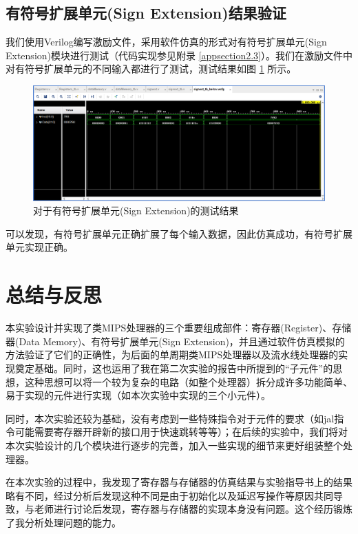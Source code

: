 \documentclass{cumcm}
\numberwithin{equation}{section}
\numberwithin{equation}{subsection}
\begin{document}
\subsection{有符号扩展单元(Sign Extension)结果验证}\label{section4.3}

我们使用Verilog编写激励文件，采用软件仿真的形式对有符号扩展单元(Sign Extension)模块进行测试（代码实现参见附录 \ref{appsection2.3}）。我们在激励文件中对有符号扩展单元的不同输入都进行了测试，测试结果如图 \ref{fig5} 所示。

\begin{figure}[htbp]
    \centering
    \includegraphics[width=6.3in]{3.png}
    \caption{对于有符号扩展单元(Sign Extension)的测试结果}
    \label{fig5}
\end{figure}

可以发现，有符号扩展单元正确扩展了每个输入数据，因此仿真成功，有符号扩展单元实现正确。

\section{总结与反思}\label{section5}
本实验设计并实现了类MIPS处理器的三个重要组成部件：寄存器(Register)、存储器(Data Memory)、有符号扩展单元(Sign Extension)，并且通过软件仿真模拟的方法验证了它们的正确性，为后面的单周期类MIPS处理器以及流水线处理器的实现奠定基础。同时，这也运用了我在第二次实验的报告中所提到的“子元件”的思想，这种思想可以将一个较为复杂的电路（如整个处理器）拆分成许多功能简单、易于实现的元件进行实现（如本次实验中实现的三个小元件）。

同时，本次实验还较为基础，没有考虑到一些特殊指令对于元件的要求（如jal指令可能需要寄存器开辟新的接口用于快速跳转等等）；在后续的实验中，我们将对本次实验设计的几个模块进行逐步的完善，加入一些实现的细节来更好组装整个处理器。

在本次实验的过程中，我发现了寄存器与存储器的仿真结果与实验指导书上的结果略有不同，经过分析后发现这种不同是由于初始化以及延迟写操作等原因共同导致，与老师进行讨论后发现，寄存器与存储器的实现本身没有问题。这个经历锻炼了我分析处理问题的能力。
\end{document}
